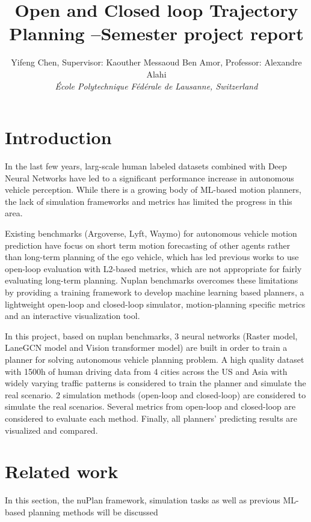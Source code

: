 \documentclass[10pt,conference,compsocconf]{IEEEtran}
\begin{document}
\title{Open and Closed loop Trajectory Planning --Semester project report}

\author{
Yifeng Chen, Supervisor: Kaouther Messaoud Ben Amor, Professor: Alexandre Alahi\\
  \textit{\'Ecole Polytechnique F\'ed\'erale de Lausanne, Switzerland}
}

\maketitle

\section{Introduction} \label{sec:Introduction}
In the last few years,
larg-scale human labeled datasets combined with Deep Neural Networks have led to a significant performance increase in autonomous vehicle perception. While there is a growing body of ML-based motion planners, the lack of simulation frameworks and metrics has limited the progress in this area. 

Existing benchmarks (Argoverse, Lyft, Waymo) for autonomous vehicle motion prediction have focus on short term motion forecasting of other agents rather than long-term planning of the ego vehicle, which has led previous works to use open-loop evaluation with L2-based metrics, which are not appropriate for fairly evaluating long-term planning. Nuplan benchmarks overcomes these limitations by providing a training framework to develop machine learning based planners, a lightweight open-loop and closed-loop simulator, motion-planning specific metrics and an interactive visualization tool.

In this project, based on nuplan benchmarks, 3 neural networks (Raster model, LaneGCN model and Vision transformer model) are built in order to train a planner for solving autonomous vehicle planning problem. A high quality dataset with 1500h of human driving data from 4 cities across the US and Asia with widely varying traffic patterns is considered to train the planner and simulate the real scenario. 2 simulation methods (open-loop and closed-loop) are considered to simulate the real scenarios. Several metrics from open-loop and closed-loop are considered to evaluate each method. Finally, all planners' predicting results are visualized and compared.


\section{Related work}
In this section, the nuPlan framework, simulation tasks as well as previous ML-based planning methods will be discussed
\end{document}
